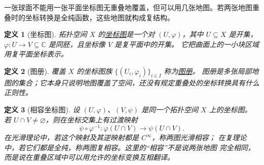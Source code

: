 \documentclass[UTF8,fontset=none,a4paper,11pt]{ctexart}
\theoremstyle{foundation-definition}
\newtheorem{definition}{定义}[section]
\theoremstyle{foundation-theorem}
\theoremstyle{foundation-proposition}
\theoremstyle{foundation-example}
\theoremstyle{foundation-remark}
\theoremstyle{foundation-theorem}
\newcommand{\C}{\mathbb C}
\newcommand{\term}[2]{\hyperref[#1]{#2}}
\begin{document}
一张球面不能用一张平面坐标图无重叠地覆盖，但可以用几张地图。若两张地图重叠时的坐标转换是全纯函数，这些地图就构成复结构。

\begin{center}
\centering
{}
\label{fig:complex-atlas}
\end{center}

\begin{definition}[坐标图]\label{def:coordinate-chart}
拓扑空间 \(X\) 的\term{def:coordinate-chart}{坐标图}是一个对 \((U,\varphi)\)，其中
\(U\subseteq X\) 是开集，\(\varphi:U\to V\subseteq\mathbb C\) 是同胚，且坐标像 \(V\) 是复平面中的开集。
它把曲面上的一小块区域用复平面坐标表示。
\end{definition}

\begin{definition}[图册]\label{def:atlas}
覆盖 \(X\) 的坐标图族 \(\{(U_i,\varphi_i)\}_{i\in I}\) 称为\term{def:atlas}{图册}。
图册是多张局部地图的集合；它本身只说明地图覆盖了空间，还没有规定重叠处的坐标转换具有什么正则性。
\end{definition}

\begin{definition}[相容坐标图]\label{def:compatible-charts}
设 \((U,\varphi)\)、\((V,\psi)\) 是同一个拓扑空间 \(X\) 上的坐标图。
若 \(U\cap V\ne\varnothing\)，则在坐标交集上有过渡映射
\[
\psi\circ\varphi^{-1}:
\varphi(U\cap V)\longrightarrow\psi(U\cap V).
\]
在光滑理论中，若这个映射及其逆映射都是 \(C^\infty\)，称两图光滑相容；
在复理论中，若它们都是全纯，称两图复相容。这里的“相容”不是说两张地图
完全相同，而是说在重叠区域中可以用允许的坐标变换互相翻译。
\end{definition}
\end{document}

